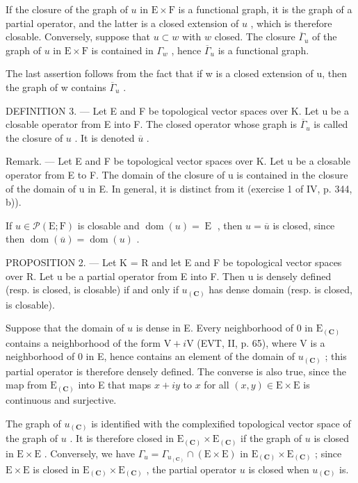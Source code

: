 If the closure of the graph of \(u\) in \(\mathrm{E} \times \mathrm{F}\) is a functional graph, it is the graph of a partial operator, and the latter is a closed extension of \(u\) , which is therefore closable. Conversely, suppose that \(u \subset w\) with \(w\) closed. The closure \(\overline{\Gamma}_u\) of the graph of \(u\) in \(\mathrm{E} \times \mathrm{F}\) is contained in \(\Gamma_w\) , hence \(\overline{\Gamma}_u\) is a functional graph.

The last assertion follows from the fact that if w is a closed extension of u, then the graph of w contains \(\overline{\Gamma}_{u}\) .

DEFINITION 3. --- Let E and F be topological vector spaces over K. Let u be a closable operator from E into F. The closed operator whose graph is \(\overline{\Gamma}_{u}\) is called the closure of \(u\) . It is denoted \(\overline{u}\) .

Remark. --- Let E and F be topological vector spaces over K. Let u be a closable operator from E to F. The domain of the closure of u is contained in the closure of the domain of u in E. In general, it is distinct from it (exercise 1 of IV, p. 344, b)).

If \(u \in \mathcal{P}(\mathrm{E};\mathrm{F})\) is closable and \(\operatorname{dom}(u) = \operatorname{E}\) , then \(u = \overline{u}\) is closed, since then \(\operatorname{dom}(\overline{u}) = \operatorname{dom}(u)\) .

PROPOSITION 2. --- Let K = R and let E and F be topological vector spaces over R. Let u be a partial operator from E into F. Then u is densely defined (resp. is closed, is closable) if and only if \(u_{(\mathbf{C})}\) has dense domain (resp. is closed, is closable).

Suppose that the domain of \(u\) is dense in E. Every neighborhood of 0 in \(\mathrm{E}_{(\mathbf{C})}\) contains a neighborhood of the form \(\mathrm{V} + i\mathrm{V}\) (EVT, II, p. 65), where V is a neighborhood of 0 in E, hence contains an element of the domain of \(u_{(\mathbf{C})}\) ; this partial operator is therefore densely defined. The converse is also true, since the map from \(\mathrm{E}_{(\mathbf{C})}\) into E that maps \(x + iy\) to \(x\) for all \((x,y) \in \mathrm{E} \times \mathrm{E}\) is continuous and surjective.

The graph of \(u_{(\mathbf{C})}\) is identified with the complexified topological vector space of the graph of \(u\) . It is therefore closed in \(\mathrm{E}_{(\mathbf{C})} \times \mathrm{E}_{(\mathbf{C})}\) if the graph of \(u\) is closed in \(\mathrm{E} \times \mathrm{E}\) . Conversely, we have \(\Gamma_u = \Gamma_{u_{(\mathbf{C})}} \cap (\mathrm{E} \times \mathrm{E})\) in \(\mathrm{E}_{(\mathbf{C})} \times \mathrm{E}_{(\mathbf{C})}\) ; since \(\mathrm{E} \times \mathrm{E}\) is closed in \(\mathrm{E}_{(\mathbf{C})} \times \mathrm{E}_{(\mathbf{C})}\) , the partial operator \(u\) is closed when \(u_{(\mathbf{C})}\) is.

